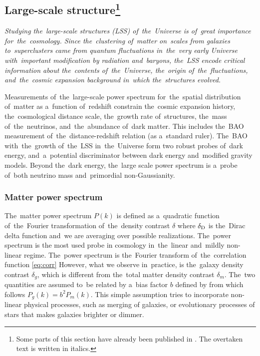 \subsection[Large-scale structure]{Large-scale structure\footnote{Some parts of this section have already been published in \textcite{mastersthesis_vrastil}. The overtaken text is written in italics.}}
\label{ssec:lss}
{\itshape
Studying the~large-scale structures (LSS) of~the~Universe is of~great importance for~the~cosmology. Since the~clustering of~matter on~scales from galaxies to~superclusters came from quantum fluctuations in~the~very early Universe with~important modification by radiation and~baryons, the~LSS encode critical information about the~contents of~the~Universe, the~origin of~the~fluctuations, and~the~cosmic expansion background in~which the~structures evolved.

Measurements of~the~large-scale power spectrum for~the~spatial distribution of~matter as a~function of~redshift constrain the~cosmic expansion history, the~cosmological distance scale, the~growth rate of~structures, the~mass of~the~neutrinos, and~the~abundance of~dark matter. This includes the~BAO measurement of~the~distance-redshift relation (as a~standard ruler). The~BAO with~the~growth of~the~LSS in~the~Universe form two robust probes of~dark energy, and~a~potential discriminator between dark energy and~modified gravity models. Beyond the~dark energy, the~large scale power spectrum is a~probe of~both neutrino mass and~primordial non-Gaussianity.
}
\subsubsection{Matter power spectrum}
The~matter power spectrum $P(k)$ is defined as a~quadratic function of~the~Fourier transformation of~the~density contrast $\delta$ \parencite{2010deto.book.....A}
where $\delta_{\rm D}$ is the~Dirac delta function and~we are averaging over possible realizations. The~power spectrum is the most used probe in cosmology in~the~linear and~mildly non-linear regime. The~power spectrum is the~Fourier transform of~the~correlation function \eqref{eq:corr}
However, what we observe in~practice, is the~galaxy density contrast $\delta_g$, which is different from the~total matter density contrast $\delta_m$. The~two quantities are assumed to~be related by a~bias factor $b$ defined by \parencite{2010deto.book.....A}
from which follows $P_g(k)=b^2P_m(k)$. This simple assumption tries to incorporate non-linear physical processes, such as merging of galaxies, or evolutionary processes of stars that makes galaxies brighter or dimmer.

